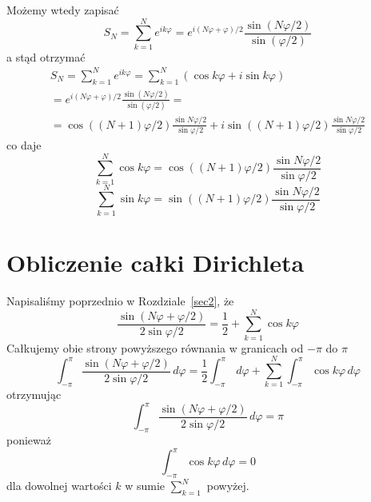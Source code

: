 Możemy wtedy zapisać
\begin{equation}
S_{N} = \sum_{k=1}^{N} e^{ik\varphi} = e^{i(N\varphi + \varphi)/2}  \frac{\sin(N\varphi/2)}{\sin(\varphi/2)}
\end{equation}
a stąd otrzymać
\begin{eqnarray}
S_{N} = \sum_{k=1}^{N} e^{ik\varphi} = \sum_{k=1}^{N} (\cos k \varphi + i \sin k \varphi)             \\ \nonumber
=
e^{i(N\varphi + \varphi)/2}  \frac{\sin(N\varphi/2)}{\sin(\varphi/2)}  =  \\ \nonumber
=
\cos((N+1) \varphi/2) \frac{\sin N \varphi/2}{\sin \varphi/2} + i \sin((N+1) \varphi/2) \frac{\sin N \varphi/2}{\sin \varphi/2}
\end{eqnarray}
co daje
\begin{equation}
    \sum_{k=1}^{N} \cos k \varphi = 
    \cos((N+1) \varphi/2) \frac{\sin N \varphi/2}{\sin \varphi/2}
\end{equation}
\begin{equation}
    \sum_{k=1}^{N} \sin k \varphi = 
    \sin((N+1) \varphi/2) \frac{\sin N \varphi/2}{\sin \varphi/2}
\end{equation}



\section{Obliczenie całki Dirichleta}
\label{sec-Dirichlet_integral_evaluation}



Napisaliśmy poprzednio w Rozdziale~\ref{sec2}, że
\begin{equation}
\frac{\sin(N\varphi+\varphi/2)}{2 \sin \varphi/2}
=
\frac{1}{2} + \sum_{k=1}^{N} \cos k \varphi 
\end{equation}
Całkujemy obie strony powyższego równania w granicach od $-\pi$ do $\pi$
\begin{equation}
\int_{-\pi}^{\pi} \frac{\sin(N\varphi+\varphi/2)}{2 \sin \varphi/2} \, d\varphi
=
\frac{1}{2} \int_{-\pi}^{\pi}  \, d\varphi + \sum_{k=1}^{N}  \int_{-\pi}^{\pi} \cos k \varphi   \, d\varphi
\end{equation}
otrzymując
\begin{equation}
\int_{-\pi}^{\pi} \frac{\sin(N\varphi+\varphi/2)}{2 \sin \varphi/2} \, d\varphi
=
\pi
\end{equation}
ponieważ
\begin{equation}
\int_{-\pi}^{\pi} \cos k \varphi   \, d\varphi = 0
\end{equation}
dla dowolnej wartości $k$ w sumie $\sum_{k=1}^{N}$ powyżej.

